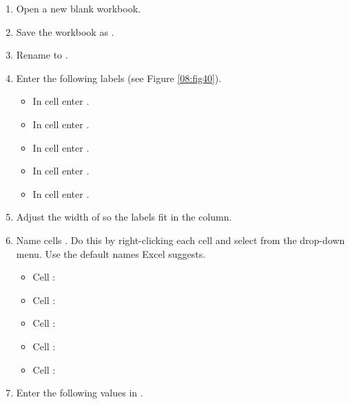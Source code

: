 \begin{enumerate}
	\item Open a new blank workbook.
	\item Save the workbook as .
	\item Rename  to .
	\item Enter the following labels (see Figure \ref{08:fig40}).
	
	\begin{itemize}
		\item In cell  enter .
		\item In cell  enter .
		\item In cell  enter .
		\item In cell  enter .
		\item In cell  enter .
	\end{itemize}
	
	\item Adjust the width of  so the labels fit in the column.
	\item Name cells . Do this by right-clicking each cell and select  from the drop-down menu. Use the default names Excel suggests.

	\begin{itemize}
		\item Cell : 
		\item Cell : 
		\item Cell : 
		\item Cell : 
		\item Cell : 
	\end{itemize}

	\item Enter the following values in .


\end{enumerate}
